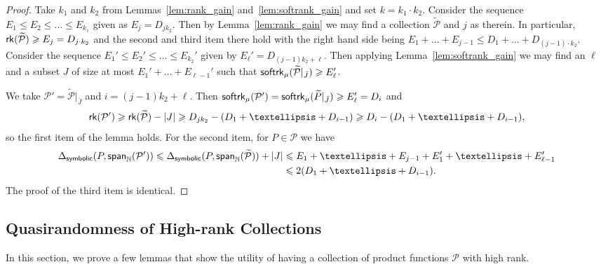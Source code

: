 \documentclass[10pt,a4paper]{amsart}
\newcommand\card[1]{\left| {#1} \right|}
\newcommand\spn{{\sf span}_{\mathbb{N}}}
\renewcommand\geq{\geqslant}
\renewcommand\leq{\leqslant}
\begin{document}
    \begin{proof}
        Take $k_1$ and $k_2$ from Lemmas~\ref{lem:rank_gain} and~\ref{lem:softrank_gain} and set $k=k_1\cdot k_2$. Consider the sequence $E_1\leq E_2\leq\ldots\leq E_{k_1}$ given as $E_j = D_{j k_2}$. Then by Lemma~\ref{lem:rank_gain} we may find a collection $\widetilde{\mathcal{P}}$ and $j$ as therein. In particular, 
        ${\sf rk}(\widetilde{\mathcal{P}})\geq E_j = D_{j\cdot k_2}$ and 
        the second and third item there hold with the right hand side being $E_1+\ldots+E_{j-1}\leq D_1+\ldots+D_{(j-1)\cdot k_2}$. Consider the sequence $E_1'\leq E_2'\leq\ldots\leq E_{k_2}'$ given by $E_\ell' = D_{(j-1)k_2+\ell}$. Then applying Lemma~\ref{lem:softrank_gain} we may find an $\ell$ and a subset $J$ of size at most $E_1'+\ldots + E_{\ell-1}'$ such that ${\sf softrk}_{\mu}(\widetilde{\mathcal{P}}|_{\bar{J}})\geq E_{\ell}'$. 
        
        We take $\mathcal{P}' = \widetilde{\mathcal{P}}|_{\bar{J}}$ and $i=(j-1)k_2+\ell$. Then ${\sf softrk}_{\mu}(\mathcal{P}') = {\sf softrk}_{\mu}(\widetilde{P}|_{\bar{J}})\geq E_{\ell}' = D_{i}$ and 
        \[
        {\sf rk}(\mathcal{P}')
        \geq 
        {\sf rk}(\widetilde{\mathcal{P}})-\card{J}
        \geq D_{j k_2}
        -
        (D_1+\ldots+D_{i-1})
        \geq D_i-
        (D_1+\ldots+D_{i-1}),
        \]
        so the first item of the lemma holds. For the second item, for $P\in\mathcal{P}$ we have
        \begin{align*}
        \Delta_{{\sf symbolic}}(P,\spn(\mathcal{P}'))
        \leq 
        \Delta_{{\sf symbolic}}(P,\spn(\widetilde{\mathcal{P}}))+\card{J}
        &\leq E_1+\ldots+E_{j-1}+E_1'+\ldots+E_{\ell-1}'\\
        &\leq 
        2(D_1+\ldots+D_{i-1}).
        \end{align*}
        The proof of the third item is identical.
    \end{proof}
    
    \subsection{Quasirandomness of High-rank Collections}\label{sec:quasirandom_props}
In this section, we prove a few lemmas that show the utility of having a collection of product functions $\mathcal{P}$ with high rank.
\end{document}
